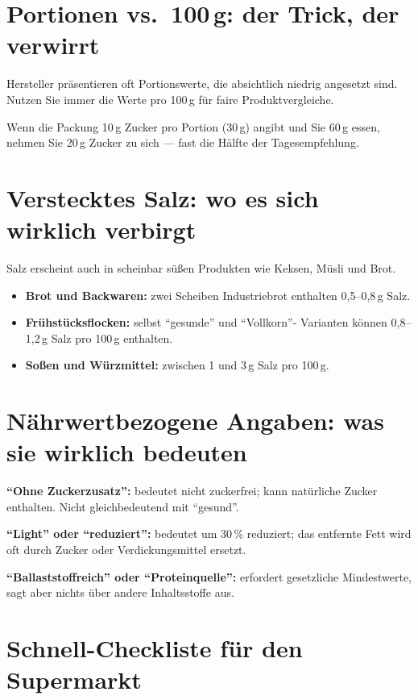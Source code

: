 \documentclass[a5paper,12pt,oneside,openany]{book}
\newcommand{\boxgelb}[2]{%
  \begin{tcolorbox}[kastenbase,
    colback=gelb!12!white, colframe=gelb!80!black, title={#1}]
  #2\end{tcolorbox}}
\begin{document}
\section{Portionen vs.\ 100\,g: der Trick, der verwirrt}

Hersteller pr\"{a}sentieren oft Portionswerte, die absichtlich niedrig
angesetzt sind. Nutzen Sie immer die Werte pro 100\,g f\"{u}r faire
Produktvergleiche.

\boxgelb{Beispiel}{Wenn die Packung 10\,g Zucker pro Portion (30\,g) angibt und
Sie 60\,g essen, nehmen Sie 20\,g Zucker zu sich --- fast die H\"{a}lfte der
Tagesempfehlung.}

\section{Verstecktes Salz: wo es sich wirklich verbirgt}

Salz erscheint auch in scheinbar s\"{u}{\ss}en Produkten wie Keksen,
M\"{u}sli und Brot.

\begin{itemize}
  \item \textbf{Brot und Backwaren:} zwei Scheiben Industriebrot enthalten
    0,5--0,8\,g Salz.
  \item \textbf{Fr\"{u}hst\"{u}cksflocken:} selbst ``gesunde'' und ``Vollkorn''-
    Varianten k\"{o}nnen 0,8--1,2\,g Salz pro 100\,g enthalten.
  \item \textbf{So{\ss}en und W\"{u}rzmittel:} zwischen 1 und 3\,g Salz
    pro 100\,g.
\end{itemize}

\section{N\"{a}hrwertbezogene Angaben: was sie wirklich bedeuten}

\textbf{``Ohne Zuckerzusatz'':} bedeutet nicht zuckerfrei; kann nat\"{u}rliche
Zucker enthalten. Nicht gleichbedeutend mit ``gesund''.

\textbf{``Light'' oder ``reduziert'':} bedeutet um 30\,\% reduziert; das
entfernte Fett wird oft durch Zucker oder Verdickungsmittel ersetzt.

\textbf{``Ballaststoffreich'' oder ``Proteinquelle'':} erfordert gesetzliche
Mindestwerte, sagt aber nichts \"{u}ber andere Inhaltsstoffe aus.

\section{Schnell-Checkliste f\"{u}r den Supermarkt}
\end{document}
